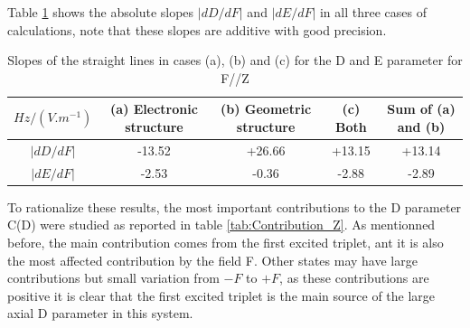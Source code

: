 \documentclass[10pt]{report}
\numberwithin{equation}{section}
\begin{document}
Table \ref{Slope_D_Z} shows the absolute slopes $|dD/dF|$ and $|dE/dF|$ in all three cases of calculations, note that these slopes are additive with good precision.

\begin{table}[!h]
    \begin{tabular}{c | c c c c}
        \hline
        $Hz/(V.m^{-1})$ &  (a) Electronic structure & (b) Geometric structure & (c) Both & Sum of (a) and (b)\\
        \hline
        $|dD/dF|$ & -13.52	& +26.66& 	+13.15 & 	+13.14\\
        $|dE/dF|$ &-2.53& 	-0.36& 	-2.88& 	-2.89\\
    \end{tabular}
    \caption{Slopes of the straight lines in cases (a), (b) and (c) for the D and E parameter for F//Z}
    \label{Slope_D_Z}
\end{table}

To rationalize these results, the most important contributions to the D parameter C(D) were studied as reported in table \ref{tab:Contribution_Z}.
As mentionned before, the main contribution comes from the first excited triplet, ant it is also the most affected contribution by the field F.
Other states may have large contributions but small variation from $-F$ to $+F$, as these contributions are positive it is clear that the first excited triplet is the main source of the large axial D parameter in this system.
\end{document}
